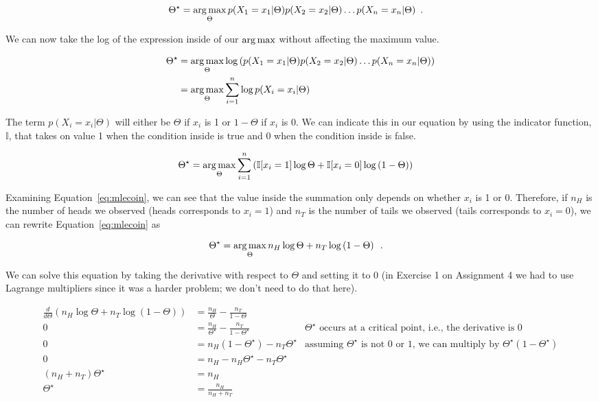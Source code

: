 \documentclass[review_Solutions]{subfiles}
\begin{document}
\begin{align}
\Theta^\star &= \operatorname*{arg\,max}_{\Theta} p(X_1 = x_1 | \Theta) p(X_2 = x_2 | \Theta) \ldots p(X_n = x_n | \Theta) \enspace .
\end{align}

We can now take the log of the expression inside of our $\operatorname*{arg\,max}$ without affecting the maximum value.


\begin{align}
\Theta^\star &= \operatorname*{arg\,max}_{\Theta} \log \left ( p(X_1 = x_1 | \Theta) p(X_2 = x_2 | \Theta) \ldots p(X_n = x_n | \Theta) \right) \nonumber \\
&= \operatorname*{arg\,max}_{\Theta} \sum_{i=1}^n \log  p(X_i = x_i | \Theta)
\end{align}

The term $p(X_i = x_i | \Theta)$ will either be $\Theta$ if $x_i$ is 1 or $1-\Theta$ if $x_i$ is 0.  We can indicate this in our equation by using the indicator function, $\mathbb{I}$, that takes on value 1 when the condition inside is true and 0 when the condition inside is false.

\begin{align}
\Theta^\star &= \operatorname*{arg\,max}_{\Theta} \sum_{i=1}^n \left ( \mathbb{I} [ x_i =1] \log \Theta  + \mathbb{I}[x_i = 0]  \log\left (1-  \Theta \right) \right) \label{eq:mlecoin}
\end{align}

Examining Equation~\ref{eq:mlecoin}, we can see that the value inside the summation only depends on whether $x_i$ is 1 or 0.  Therefore, if $n_{H}$ is the number of heads we observed (heads corresponds to $x_i = 1$) and $n_{T}$ is the number of tails we observed (tails corresponds to $x_i = 0$), we can rewrite Equation~\ref{eq:mlecoin} as


\begin{align}
\Theta^\star &= \operatorname*{arg\,max}_{\Theta} n_H \log \Theta  + n_T  \log\left (1-  \Theta \right) \label{eq:mlecoincount} \enspace .
\end{align}

We can solve this equation by taking the derivative with respect to $\Theta$ and setting it to 0 (in Exercise 1 on Assignment 4 we had to use Lagrange multipliers since it was a harder problem; we don't need to do that here).

\begin{align}
\frac{d}{d\Theta} \left ( n_H \log \Theta  + n_T  \log\left (1-  \Theta \right) \right) &=  \frac{n_H}{\Theta} - \frac{n_T}{1-\Theta} \nonumber \\
0 &= \frac{n_H}{\Theta^\star} - \frac{n_T}{1-\Theta^\star} \nonumber & \mbox{$\Theta^\star$ occurs at a critical point, i.e., the derivative is $0$}\\
0 &=  n_H(1-\Theta^\star) - n_T \Theta^\star &\mbox{assuming $\Theta^\star$ is not 0 or 1, we can multiply by $\Theta^\star(1-\Theta^\star)$} \nonumber \\
0&= n_H - n_H \Theta^\star -  n_T \Theta^\star \nonumber \\
(n_H + n_T) \Theta^\star &= n_H \nonumber \\
\Theta^\star &= \frac{n_H}{n_H + n_T} \nonumber \\
\end{align}
\end{document}
